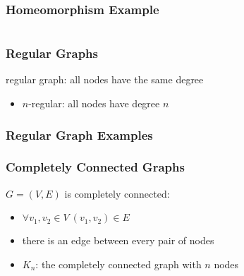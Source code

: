 \documentclass[dvipsnames]{beamer}
\begin{document}
\begin{frame}
  \frametitle{Homeomorphism Example}

  \begin{example}
    \begin{columns}
      \begin{center}
      \end{center}

      \begin{center}
      \end{center}
    \end{columns}
  \end{example}
\end{frame}

\begin{frame}
  \frametitle{Regular Graphs}

  \begin{definition}
    \alert{regular} graph: all nodes have the same degree

    \begin{itemize}
      \item $n$-regular: all nodes have degree $n$
    \end{itemize}
  \end{definition}
\end{frame}

\begin{frame}
  \frametitle{Regular Graph Examples}

  \begin{example}
    \begin{center}
    \end{center}
  \end{example}
\end{frame}

\begin{frame}
  \frametitle{Completely Connected Graphs}

  \begin{definition}
    $G=(V,E)$ is \alert{completely connected}:
    \begin{itemize}
      \item $\forall v_1,v_2 \in V~(v_1,v_2) \in E$
    \end{itemize}
  \end{definition}

  \pause
  \begin{itemize}
    \item there is an edge between every pair of nodes
    \item $K_n$: the completely connected graph with $n$ nodes
  \end{itemize}
\end{frame}
\end{document}
